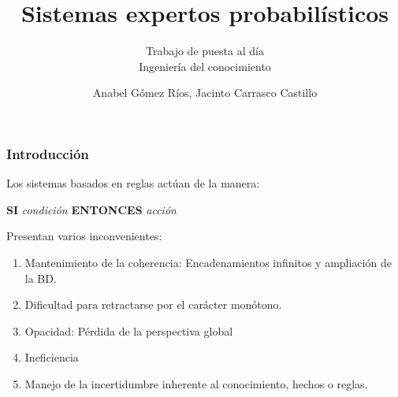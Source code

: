 \documentclass[leqno]{beamer}
\title{Sistemas expertos probabilísticos}
\subtitle{Trabajo de puesta al día\\
			Ingeniería del conocimiento}
\author{Anabel G\'omez R\'ios, Jacinto Carrasco Castillo}
\begin{document}
\begin{frame}
\titlepage
\end{frame}

\begin{frame}
\frametitle{Introducción}
 Los sistemas basados en reglas actúan de la manera:
\begin{center}
\textbf{SI} \textit{condición} \textbf{ENTONCES} \textit{acción}
\end{center}

Presentan varios inconvenientes:
\begin{enumerate}
\item Mantenimiento de la coherencia: Encadenamientos infinitos y ampliación de la BD.
\item Dificultad para retractarse por el carácter monótono.
\item Opacidad: Pérdida de la perspectiva global
\item Ineficiencia
\item Manejo de la incertidumbre inherente al conocimiento, hechos o reglas.
\end{enumerate}
\end{frame}
\end{document}
